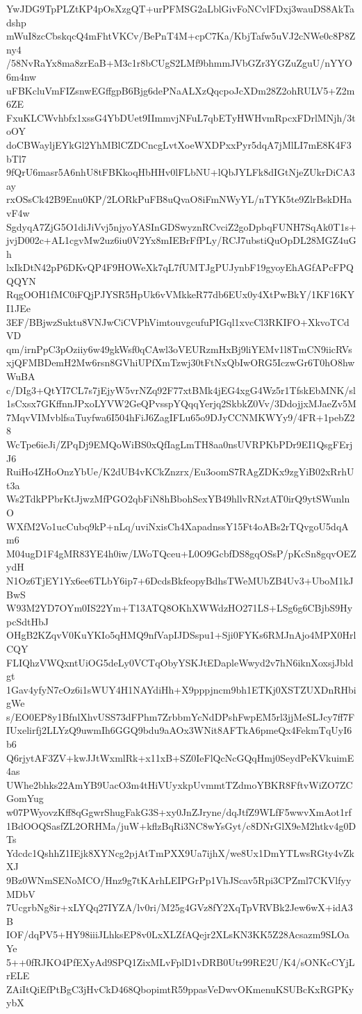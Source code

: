 YwJDG9TpPLZtKP4pOsXzgQT+urPFMSG2aLblGivFoNCvlFDxj3wauDS8AkTadshp
mWuI8zcCbskqcQ4mFhtVKCv/BePnT4M+cpC7Ka/KbjTafw5uVJ2cNWe0c8P8Zny4
/58NvRaYx8ma8zrEaB+M3c1r8bCUgS2LMf9bhmmJVbGZr3YGZuZguU/nYYO6m4nw
uFBKcluVmFIZsnwEGffgpB6Bjg6dePNaALXzQqcpoJcXDm28Z2ohRULV5+Z2m6ZE
FxuKLCWvhbfx1xssG4YbDUet9IImmvjNFuL7qbETyHWHvmRpcxFDrlMNjh/3toOY
doCBWayljEYkGl2YhMBlCZDCncgLvtXoeWXDPxxPyr5dqA7jMlLI7mE8K4F3bTl7
9fQrU6masr5A6nhU8tFBKkoqHbHHv0lFLbNU+lQbJYLFk8dIGtNjeZUkrDiCA3ay
rxOSsCk42B9Enu0KP/2LORkPuFB8uQvaO8iFmNWyYL/nTYK5te9ZlrBskDHavF4w
SgdyqA7ZjG5O1diJiVvj5njyoYASInGDSwyznRCvciZ2goDpbqFUNH7SqAk0T1s+
jvjD002c+AL1cgvMw2uz6iu0V2Yx8mIEBrFfPLy/RCJ7ubstiQuOpDL28MGZ4uGh
lxIkDtN42pP6DKvQP4F9HOWeXk7qL7fUMTJgPUJynbF19gyoyEhAGfAPcFPQQQYN
RqgOOH1fMC0iFQjPJYSR5HpUk6vVMkkeR77db6EUx0y4XtPwBkY/1KF16KYI1JEe
3EF/BBjwzSuktu8VNJwCiCVPhVimtouvgcufuPIGql1xvcCl3RKIFO+XkvoTCdVD
qm/irnPpC3pOziiy6w49gkWsf0qCAwl3oVEURzmHxBj9liYEMv1l8TmCN9iicRVs
xjQFMBDemH2Mw6rsn8GVhiUPfXmTzwj30tFtNxQbIwORG5IczwGr6T0hO8hwWuBA
c/DIg3+QtYI7CL7s7jEjyW5vrNZq92F77xtBMk4jEG4xgG4Wz5r1TfskEbMNK/sl
1sCxsx7GKffnnJPxoLYVW2GeQPvsspYQqqYerjq2SkbkZ0Vv/3DdojjxMJaeZv5M
7MqvVIMvblfsaTuyfwa6I504hFiJ6ZagIFLu65o9DJyCCNMKWYy9/4FR+1pebZ28
WcTpe6ieJi/ZPqDj9EMQoWiBS0xQfIagLmTH8aa0nsUVRPKbPDr9EI1QsgFErjJ6
RuiHo4ZHoOnzYbUe/K2dUB4vKCkZnzrx/Eu3oomS7RAgZDKx9zgYiB02xRrhUt3a
Ws2TdkPPbrKtJjwzMfPGO2qbFiN8hBbohSexYB49hllvRNztAT0irQ9ytSWunlnO
WXfM2Vo1ucCubq9kP+nLq/uviNxisCh4XapadnssY15Ft4oABs2rTQvgoU5dqAm6
M04ugD1F4gMR83YE4h0iw/LWoTQceu+L0O9GcbfDS8gqOSsP/pKcSn8gqvOEZydH
N1Oz6TjEY1Yx6ee6TLbY6ip7+6DcdsBkfeopyBdhsTWeMUbZB4Uv3+UboM1kJBwS
W93M2YD7OYm0IS22Ym+T13ATQ8OKhXWWdzHO271LS+LSg6g6CBjbS9HypcSdtHbJ
OHgB2KZqvV0KuYKIo5qHMQ9nfVapIJDSspu1+Sji0FYKs6RMJnAjo4MPX0HrlCQY
FLIQhzVWQxntUiOG5deLy0VCTqObyYSKJtEDapleWwyd2v7hN6iknXoxsjJbldgt
1Gav4yfyN7cOz6i1sWUY4H1NAYdiHh+X9pppjncm9bh1ETKj0XSTZUXDnRHbigWe
s/EO0EP8y1BfnlXhvUSS73dFPhm7ZrbbmYcNdDPshFwpEM5rl3jjMeSLJcy7ff7F
IUxelirfj2LLYzQ9uwmIh6GGQ9bdu9aAOx3WNit8AFTkA6pmeQx4FekmTqUyI6b6
Q6rjytAF3ZV+kwJJtWxmlRk+x11xB+SZ0IeFlQcNcGQqHmj0SeydPeKVkuimE4as
UWhe2bhks22AmYB9UacO3m4tHiVUyxkpUvmmtTZdmoYBKR8FftvWiZO7ZCGomYug
w07PWyovzKff8qGgwrShugFakG3S+xy0JnZJryne/dqJtfZ9WLfF5wwvXmAot1rf
1BdOOQSasfZL2ORHMa/juW+kflzBqRi3NC8wYsGyt/c8DNrGlX9eM2htkv4g0DTs
Ydcdc1QshhZ1IEjk8XYNcg2pjAtTmPXX9Ua7ijhX/we8Ux1DmYTLwsRGty4vZkXJ
9Bz0WNmSENoMCO/Hnz9g7tKArhLEIPGrPp1VhJScav5Rpi3CPZml7CKVlfyyMDbV
7UcgrbNg8ir+xLYQq27IYZA/lv0ri/M25g4GVz8fY2XqTpVRVBk2Jew6wX+idA3B
IOF/dqPV5+HY98iiiJLhksEP8v0LxXLZfAQejr2XLsKN3KK5Z28Acsazm9SLOaYe
5++0fRJKO4PfEXyAd9SPQ1ZixMLvFplD1vDRB0Utr99RE2U/K4/sONKcCYjLrELE
ZAiItQiEfPtBgC3jHvCkD468QbopimtR59ppasVeDwvOKmenuKSUBcKxRGPKyybX
